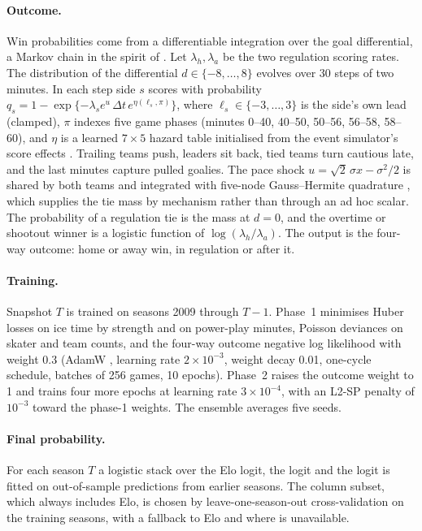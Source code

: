\paragraph{Outcome.}
Win probabilities come from a differentiable integration over the goal
differential, a Markov chain in the spirit of \citet{kaplan2014markov}. Let $\lambda_h, \lambda_a$ be the two regulation scoring rates. The
distribution of the differential $d \in \{-8, \dots, 8\}$ evolves over 30 steps of
two minutes. In each step side $s$ scores with probability
$q_s = 1 - \exp\{-\lambda_s e^{u}\,\Delta t\, e^{\eta(\ell_s, \pi)}\}$, where
$\ell_s \in \{-3, \dots, 3\}$ is the side's own lead (clamped), $\pi$ indexes five
game phases (minutes 0--40, 40--50, 50--56, 56--58, 58--60), and $\eta$ is a
learned $7 \times 5$ hazard table initialised from the event simulator's score
effects \citep[compare][]{thomas2013competing}. Trailing teams push, leaders
sit back, tied teams turn cautious late, and the last minutes capture pulled
goalies. The pace shock
$u = \sqrt{2}\,\sigma x - \sigma^2/2$ is shared by both teams and integrated with
five-node Gauss--Hermite quadrature \citep{abramowitz1964handbook}, which supplies the tie mass by mechanism
rather than through an ad hoc scalar. The probability of a regulation tie is
the mass at $d = 0$, and the overtime or shootout winner is a logistic function
of $\log(\lambda_h/\lambda_a)$. The output is the four-way outcome: home or away
win, in regulation or after it.

\paragraph{Training.}
Snapshot $T$ is trained on seasons 2009 through $T-1$. Phase~1 minimises
Huber losses on ice time by strength and on power-play minutes, Poisson
deviances on skater and team counts, and the four-way outcome negative log
likelihood with weight 0.3 (AdamW \citep{loshchilov2019decoupled}, learning rate $2\times10^{-3}$, weight decay
0.01, one-cycle schedule, batches of 256 games, 10 epochs). Phase~2 raises
the outcome weight to 1 and trains four more epochs at learning rate
$3\times10^{-4}$, with an L2-SP penalty \citep{li2018explicit} of $10^{-3}$
toward the phase-1 weights. The ensemble averages five seeds.

\paragraph{Final probability.}
For each season $T$ a logistic stack \citep{wolpert1992stacked} over the Elo logit, the \neurhlG{} logit and
the \neurhlH{} logit is fitted on out-of-sample predictions from earlier seasons.
The column subset, which always includes Elo, is chosen by leave-one-season-out
cross-validation on the training seasons, with a fallback to Elo and \neurhlG{}
where \neurhlH{} is unavailable.

